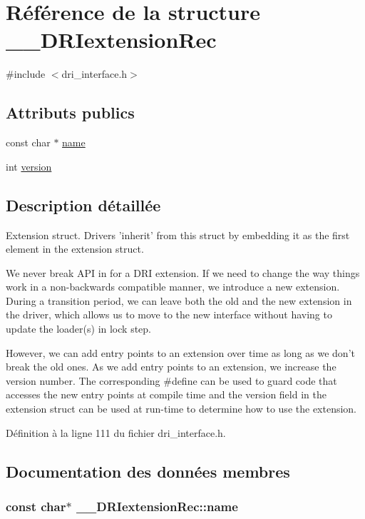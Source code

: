 \hypertarget{struct_____d_r_iextension_rec}{\section{Référence de la structure \-\_\-\-\_\-\-D\-R\-Iextension\-Rec}
\label{struct_____d_r_iextension_rec}
}


{\ttfamily \#include $<$dri\-\_\-interface.\-h$>$}

\subsection*{Attributs publics}
\begin{DoxyCompactItemize}
\item 
const char $\ast$ \hyperlink{struct_____d_r_iextension_rec_a477dbf3ee1bdd155ef7dda4896bb2540}{name}
\item 
int \hyperlink{struct_____d_r_iextension_rec_a6fa021bb0b66dbc662a4397a21ffa198}{version}
\end{DoxyCompactItemize}


\subsection{Description détaillée}
Extension struct. Drivers 'inherit' from this struct by embedding it as the first element in the extension struct.

We never break A\-P\-I in for a D\-R\-I extension. If we need to change the way things work in a non-\/backwards compatible manner, we introduce a new extension. During a transition period, we can leave both the old and the new extension in the driver, which allows us to move to the new interface without having to update the loader(s) in lock step.

However, we can add entry points to an extension over time as long as we don't break the old ones. As we add entry points to an extension, we increase the version number. The corresponding \#define can be used to guard code that accesses the new entry points at compile time and the version field in the extension struct can be used at run-\/time to determine how to use the extension. 

Définition à la ligne 111 du fichier dri\-\_\-interface.\-h.



\subsection{Documentation des données membres}
\hypertarget{struct_____d_r_iextension_rec_a477dbf3ee1bdd155ef7dda4896bb2540}{
\subsubsection[{name}]{\setlength{\rightskip}{0pt plus 5cm}const char$\ast$ \-\_\-\-\_\-\-D\-R\-Iextension\-Rec\-::name}}\label{struct_____d_r_iextension_rec_a477dbf3ee1bdd155ef7dda4896bb2540}


